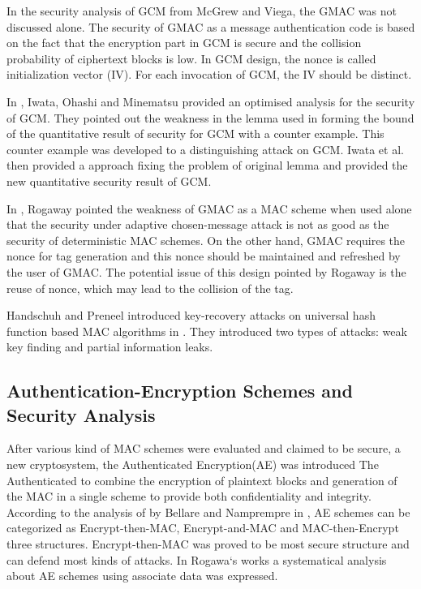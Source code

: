 \documentclass{article}
\begin{document}
In the security analysis of GCM from McGrew and Viega, the GMAC was not discussed alone. The security of GMAC as a message authentication code is based on the fact that the encryption part in GCM is secure and the collision probability of ciphertext blocks is low. 
In GCM design, the nonce is called initialization vector (IV). For each invocation of GCM, the IV should be distinct.

In \cite{breaking}, Iwata, Ohashi and Minematsu provided an optimised analysis for the security of GCM. They pointed out the weakness in the lemma used in forming the bound of the quantitative result of security for GCM with a counter example. This counter example was developed to a distinguishing attack on GCM. Iwata et al. then provided a approach fixing the problem of original lemma and provided the new quantitative security result of GCM. 

In \cite{Rogaway2011}, Rogaway pointed the weakness of GMAC as a MAC scheme when used alone that the security under adaptive chosen-message attack is not as good as the security of deterministic MAC schemes. On the other hand, GMAC requires the nonce for tag generation and this nonce should be maintained and refreshed by the user of GMAC. The potential issue of this design pointed by Rogaway is the reuse of nonce, which may lead to the collision of the tag. 

Handschuh and Preneel introduced key-recovery attacks on universal hash function based MAC algorithms in \cite{key_recover}. They introduced two types of attacks: weak key finding and partial information leaks.

\subsection{Authentication-Encryption Schemes and Security Analysis}
After various kind of MAC schemes were evaluated and claimed to be secure, a new cryptosystem, the Authenticated Encryption(AE) was introduced The Authenticated to combine the encryption of
plaintext blocks and generation of the MAC in a single scheme to provide both
confidentiality and integrity. According to the analysis of by Bellare and Namprempre in \cite{ae-notion}, AE schemes can be categorized as Encrypt-then-MAC, Encrypt-and-MAC and MAC-then-Encrypt three structures. Encrypt-then-MAC was proved to be most secure structure and can defend most kinds of attacks. 
In Rogawa`s works \cite{aead} a systematical analysis about AE
schemes using associate data was expressed.  
\end{document}
